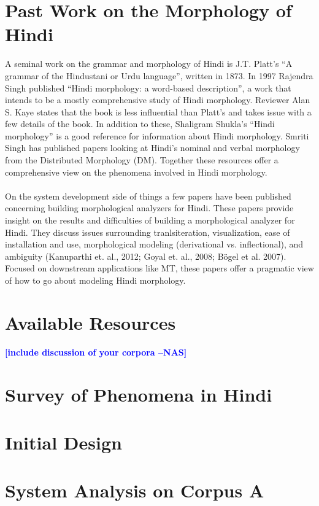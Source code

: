 \documentclass[11pt,letterpaper]{article}
\newcommand{\nascomment}[1]{\textcolor{blue}{\textbf{[#1 --NAS]}}}
\begin{document}
\section{Past Work on the Morphology of Hindi}
A seminal work on the grammar and morphology of Hindi is J.T. Platt's ``A grammar of the Hindustani or Urdu language'', written in 1873. In 1997 Rajendra Singh published ``Hindi morphology: a word-based description'', a work that intends to be a mostly comprehensive study of Hindi morphology. Reviewer Alan S. Kaye states that the book is less influential than Platt's and takes issue with a few details of the book. In addition to these, Shaligram Shukla's ``Hindi morphology'' is a good reference for information about Hindi morphology. Smriti Singh has published papers looking at Hindi's nominal and verbal morphology from the Distributed Morphology (DM). Together these resources offer a comprehensive view on the phenomena involved in Hindi morphology.\\
\\
On the system development side of things a few papers have been published concerning building morphological analyzers for Hindi. These papers provide insight on the results and difficulties of building a morphological analyzer for Hindi. They discuss issues surrounding tranlsiteration, visualization, ease of installation and use, morphological modeling (derivational vs. inflectional), and ambiguity (Kanuparthi et. al., 2012; Goyal et. al., 2008; Bögel et al. 2007). Focused on downstream applications like MT, these papers offer a pragmatic view of how to go about modeling Hindi morphology. \\
\section{Available Resources}

\nascomment{include discussion of your corpora}

\section{Survey of Phenomena in Hindi}

\section{Initial Design}

\section{System Analysis on Corpus A}
\end{document}
